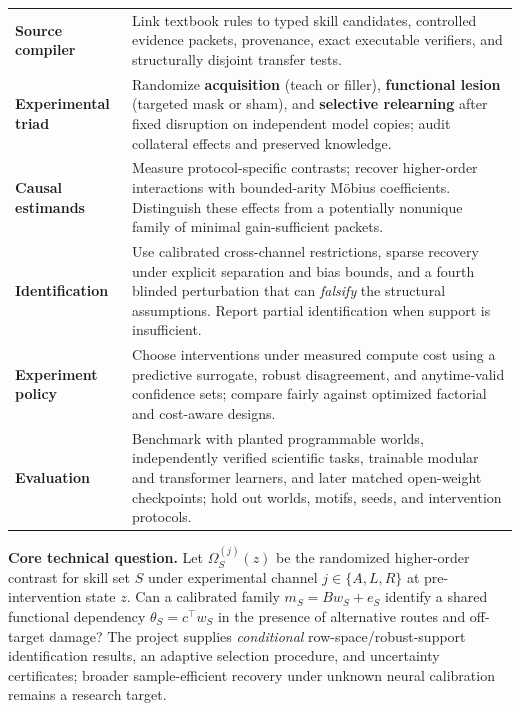 \documentclass[11pt,a4paper]{article}
\theoremstyle{definition}\newtheorem{definition}[theorem]{Definition}
\theoremstyle{remark}\newtheorem{remark}[theorem]{Remark}
\begin{document}
\vspace{2mm}
\begin{center}\renewcommand{\arraystretch}{1.17}\small
\begin{tabularx}{\linewidth}{>{\bfseries\color{aqua}}p{.18\linewidth}Y}
\toprule
Source compiler & Link textbook rules to typed skill candidates, controlled evidence packets, provenance, exact executable verifiers, and structurally disjoint transfer tests. \\
Experimental triad & Randomize \textbf{acquisition} (teach or filler), \textbf{functional lesion} (targeted mask or sham), and \textbf{selective relearning} after fixed disruption on independent model copies; audit collateral effects and preserved knowledge. \\
Causal estimands & Measure protocol-specific contrasts; recover higher-order interactions with bounded-arity M\"obius coefficients. Distinguish these effects from a potentially nonunique family of minimal gain-sufficient packets. \\
Identification & Use calibrated cross-channel restrictions, sparse recovery under explicit separation and bias bounds, and a fourth blinded perturbation that can \emph{falsify} the structural assumptions. Report partial identification when support is insufficient. \\
Experiment policy & Choose interventions under measured compute cost using a predictive surrogate, robust disagreement, and anytime-valid confidence sets; compare fairly against optimized factorial and cost-aware designs. \\
Evaluation & Benchmark with planted programmable worlds, independently verified scientific tasks, trainable modular and transformer learners, and later matched open-weight checkpoints; hold out worlds, motifs, seeds, and intervention protocols. \\
\bottomrule
\end{tabularx}
\end{center}
\vspace{1mm}
\textbf{Core technical question.} Let $\Omega_S^{(j)}(z)$ be the randomized higher-order contrast for skill set $S$ under experimental channel $j\in\{A,L,R\}$ at pre-intervention state $z$. Can a calibrated family $m_S=B w_S+e_S$ identify a shared functional dependency $\theta_S=c^\top w_S$ in the presence of alternative routes and off-target damage? The project supplies \emph{conditional} row-space/robust-support identification results, an adaptive selection procedure, and uncertainty certificates; broader sample-efficient recovery under unknown neural calibration remains a research target.
\end{document}
